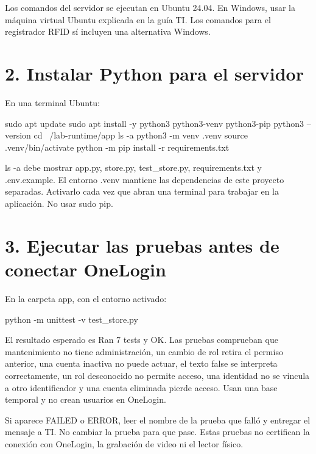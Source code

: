\documentclass[12pt,a4paper]{article}
\begin{document}
Los comandos del servidor se ejecutan en Ubuntu 24.04. En Windows, usar la máquina virtual Ubuntu explicada en la guía TI. Los comandos para el registrador RFID sí incluyen una alternativa Windows.\par
{}\section*{2. Instalar Python para el servidor}
En una terminal Ubuntu:\par
{}
\begin{Comandos}
sudo apt update
sudo apt install -y python3 python3-venv python3-pip
python3 --version
cd ~/lab-runtime/app
ls -a
python3 -m venv .venv
source .venv/bin/activate
python -m pip install -r requirements.txt
\end{Comandos}
\textnormal{ls -a} debe mostrar \textnormal{app.py}, \textnormal{store.py}, \textnormal{test\_\allowbreak{}store.py}, \textnormal{requirements.txt} y \textnormal{.env.example}. El entorno \textnormal{.venv} mantiene las dependencias de este proyecto separadas. Activarlo cada vez que abran una terminal para trabajar en la aplicación. No usar \textnormal{sudo pip}.\par
{}\section*{3. Ejecutar las pruebas antes de conectar OneLogin}
En la carpeta \textnormal{app}, con el entorno activado:\par
{}
\begin{Comandos}
python -m unittest -v test_store.py
\end{Comandos}
El resultado esperado es \textnormal{Ran 7 tests} y \textnormal{OK}. Las pruebas comprueban que mantenimiento no tiene administración, un cambio de rol retira el permiso anterior, una cuenta inactiva no puede actuar, el texto \textnormal{false} se interpreta correctamente, un rol desconocido no permite acceso, una identidad no se vincula a otro identificador y una cuenta eliminada pierde acceso. Usan una base temporal y no crean usuarios en OneLogin.\par
Si aparece \textnormal{FAILED} o \textnormal{ERROR}, leer el nombre de la prueba que falló y entregar el mensaje a TI. No cambiar la prueba para que pase. Estas pruebas no certifican la conexión con OneLogin, la grabación de video ni el lector físico.\par
\end{document}
